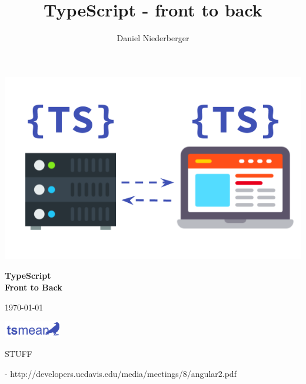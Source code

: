 \documentclass[12pt,a4paper]{report}
\title{TypeScript - front to back}
\author{Daniel Niederberger}
\begin{document}
\begin{titlepage}
	\centering
	\includegraphics[width=1\textwidth]{figures/cover-image.png}\par
	\vspace{1.5cm}
	{\huge\bfseries TypeScript \\ \Huge{Front to Back}\par}
	\vspace{2cm}


	\vfill

	{\large \today\par}
	\vspace{0.5cm}
\includegraphics[width=2.5cm]{figures/tsmean-logo.pdf}

\end{titlepage}

\cleardoublepage
{}
\tableofcontents
\cleardoublepage
{}

\newpage

STUFF

- http://developers.ucdavis.edu/media/meetings/8/angular2.pdf
\end{document}
